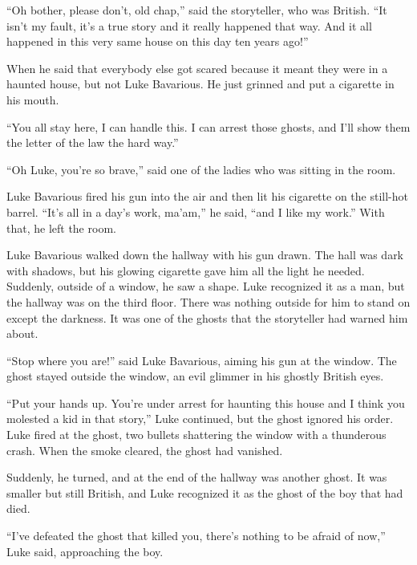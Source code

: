 ``Oh bother, please don't, old chap,'' said the storyteller, who was
British. ``It isn't my fault, it's a true story and it really
happened that way. And it all happened in this very same house on
this day ten years ago!''



When he said that everybody else got scared because it meant they
were in a haunted house, but not Luke Bavarious. He just grinned
and put a cigarette in his mouth.



``You all stay here, I can handle this. I can arrest those ghosts,
and I'll show them the letter of the law the hard way.''



``Oh Luke, you're so brave,'' said one of the ladies who was sitting
in the room.



Luke Bavarious fired his gun into the air and then lit his
cigarette on the still-hot barrel. ``It's all in a day's work,
ma'am,'' he said, ``and I like my work.'' With that, he left the
room.



Luke Bavarious walked down the hallway with his gun drawn. The hall
was dark with shadows, but his glowing cigarette gave him all the
light he needed. Suddenly, outside of a window, he saw a shape.
Luke recognized it as a man, but the hallway was on the third
floor. There was nothing outside for him to stand on except the
darkness. It was one of the ghosts that the storyteller had warned
him about.



``Stop where you are!'' said Luke Bavarious, aiming his gun at the
window. The ghost stayed outside the window, an evil glimmer in his
ghostly British eyes.



``Put your hands up. You're under arrest for haunting this house and
I think you molested a kid in that story,'' Luke continued, but the
ghost ignored his order. Luke fired at the ghost, two bullets
shattering the window with a thunderous crash. When the smoke
cleared, the ghost had vanished.



Suddenly, he turned, and at the end of the hallway was another
ghost. It was smaller but still British, and Luke recognized it as
the ghost of the boy that had died.



``I've defeated the ghost that killed you, there's nothing to be
afraid of now,'' Luke said, approaching the boy.



